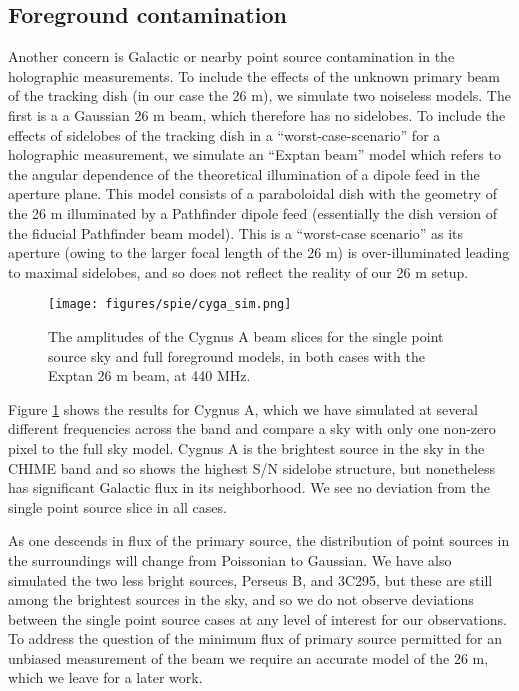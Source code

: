 \subsection{Foreground contamination}
Another concern is Galactic or nearby point source contamination in the holographic measurements. To include the effects of the unknown primary beam of the tracking dish (in our case the 26 m), we simulate two noiseless models. The first is a a Gaussian 26 m beam, which therefore has no sidelobes. To include the effects of sidelobes of the tracking dish in a ``worst-case-scenario'' for a holographic measurement, we simulate an ``Exptan beam'' model which refers to the angular dependence of the theoretical illumination of a dipole feed in the aperture plane\citep{mmodes2}. This model consists of a paraboloidal dish with the geometry of the 26 m illuminated by a Pathfinder dipole feed (essentially the dish version of the fiducial Pathfinder beam model). This is a ``worst-case scenario'' as its aperture (owing to the larger focal length of the 26 m) is over-illuminated leading to maximal sidelobes, and so does not reflect the reality of our 26 m setup.

\begin{figure}[ht] %
	\centering	
	\texttt{[image: figures/spie/cyga\_sim.png]}%
	\caption{The amplitudes of the Cygnus A beam slices for the single point source sky and full foreground models, in both cases with the Exptan 26 m beam, at 440 MHz. }
	\label{cygasim}
\end{figure}


Figure \ref{cygasim} shows the results for Cygnus A, which we have simulated at several different frequencies across the band and compare a sky with only one non-zero pixel to the full sky model. Cygnus A is the brightest source in the sky in the CHIME band and so shows the highest S/N sidelobe structure, but nonetheless has significant Galactic flux in its neighborhood. We see no deviation from the single point source slice in all cases.

As one descends in flux of the primary source, the distribution of point sources in the surroundings will change from Poissonian to Gaussian. We have also simulated the two less bright sources, Perseus B, and 3C295, but these are still among the brightest sources in the sky, and so we do not observe deviations between the single point source cases at any level of interest for our observations. To address the question of the minimum flux of primary source permitted for an unbiased measurement of the beam we require an accurate model of the 26 m, which we leave for a later work.

